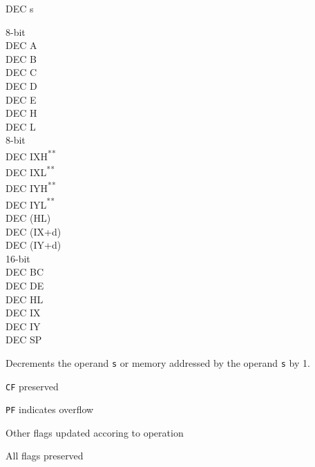 \documentclass[twoside,openright,a4paper]{book}
\newcommand{\UNDOC}{\textnormal{\textsuperscript{**}}}
\begin{document}
\begin{basedescript}{
	\desclabelstyle{\multilinelabel}
	\desclabelwidth{3cm}}
\begin{detailitem}{DEC s}
		\begin{DetailVariants}
			\textnormal{8-bit}\\
			DEC A\\
			DEC B\\
			DEC C\\
			DEC D\\
			DEC E\\
			DEC H\\
			DEC L\\
			\textnormal{8-bit}\\
			DEC IXH\UNDOC\\
			DEC IXL\UNDOC\\
			DEC IYH\UNDOC\\
			DEC IYL\UNDOC\\
			DEC (HL)\\
			DEC (IX+d)\\
			DEC (IY+d)\\
			\textnormal{16-bit}\\
			DEC BC\\
			DEC DE\\
			DEC HL\\
			DEC IX\\
			DEC IY\\
			DEC SP
		\end{DetailVariants}

		Decrements the operand {\tt s} or memory addressed by the operand {\tt s} by 1.

		\DetailEffectsTitle
		\begin{multicols}{2}
			\begin{DetailEffectsNoTitle}[8-bit]
				\item {\tt CF} preserved
				\item {\tt PF} indicates overflow
				\item Other flags updated accoring to operation				
			\end{DetailEffectsNoTitle}
		
			\columnbreak
			\begin{DetailEffectsNoTitle}[16-bit]
				\item All flags preserved				
			\end{DetailEffectsNoTitle}
		\end{multicols}
		
		\begin{DetailTiming}
		\end{DetailTiming}


\end{detailitem}
\end{basedescript}
\end{document}

